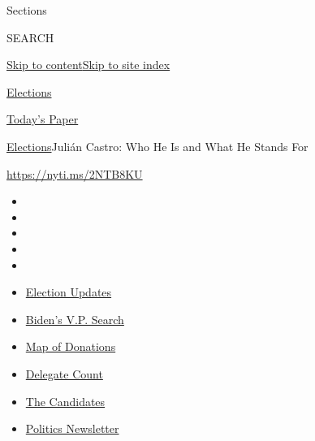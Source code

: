 Sections

SEARCH

\protect\hyperlink{site-content}{Skip to
content}\protect\hyperlink{site-index}{Skip to site index}

\href{https://www.nytimes.com/news-event/2020-election}{Elections}

\href{https://myaccount.nytimes.com/auth/login?response_type=cookie\&client_id=vi}{}

\href{https://www.nytimes.com/section/todayspaper}{Today's Paper}

\href{/news-event/2020-election}{Elections}\textbar{}Julián Castro: Who
He Is and What He Stands For

\url{https://nyti.ms/2NTB8KU}

\begin{itemize}
\item
\item
\item
\item
\item
\end{itemize}

\begin{itemize}
\item
  \href{https://www.nytimes.com/2020/07/31/us/elections/biden-vs-trump.html?action=click\&pgtype=Article\&state=default\&region=TOP_BANNER\&context=storylines_menu}{Election
  Updates}
\item
  \href{https://www.nytimes.com/article/biden-vice-president-2020.html?action=click\&pgtype=Article\&state=default\&region=TOP_BANNER\&context=storylines_menu}{Biden's
  V.P. Search}
\item
  \href{https://www.nytimes.com/interactive/2020/07/24/us/politics/trump-biden-campaign-donors.html?action=click\&pgtype=Article\&state=default\&region=TOP_BANNER\&context=storylines_menu}{Map
  of Donations}
\item
  \href{https://www.nytimes.com/interactive/2020/us/elections/delegate-count-primary-results.html?action=click\&pgtype=Article\&state=default\&region=TOP_BANNER\&context=storylines_menu}{Delegate
  Count}
\item
  \href{https://www.nytimes.com/interactive/2019/us/politics/2020-presidential-candidates.html?action=click\&pgtype=Article\&state=default\&region=TOP_BANNER\&context=storylines_menu}{The
  Candidates}
\item
  \href{https://www.nytimes.com/newsletters/politics?action=click\&pgtype=Article\&state=default\&region=TOP_BANNER\&context=storylines_menu}{Politics
  Newsletter}
\end{itemize}

